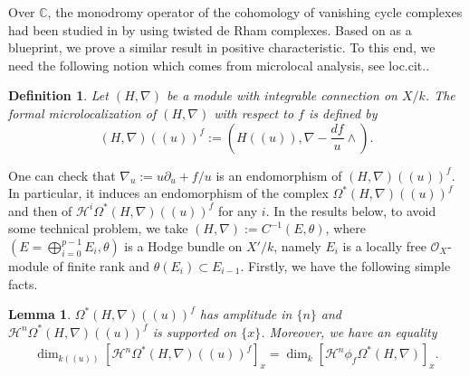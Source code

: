 \documentclass[12pt, a4paper]{article}
\newtheorem{definition}{Definition}[section]
\newtheorem{lemma}{Lemma}[section]
\begin{document}
Over $\mathbb C$, the monodromy operator of the cohomology of vanishing cycle complexes had been studied in \cite{SS} by using twisted de Rham complexes. Based on \cite[Theorem 2]{SS} as a blueprint, we prove a similar result in positive characteristic. 
To this end, we need the following notion which comes from microlocal analysis, see loc.cit..
\begin{definition}
Let $(H,\nabla)$ be a module with integrable connection on $X/k$. The formal microlocalization of $(H,\nabla)$ with respect to $f$ is defined by 
$$
(H,\nabla)((u))^f:=(H((u)),\nabla-\frac{df}{u}\wedge).
$$
\end{definition}
One can check that $\nabla_u:=u\partial_u+f/u$ is an endomorphism of $(H,\nabla)((u))^f$. In particular, it induces an endomorphism of the complex 
$\Omega^*(H,\nabla)((u))^f$ and then of $\mathcal H^i\Omega^*(H,\nabla)((u))^f$ for any $i$. In the results below, to avoid some technical problem, we take $(H,\nabla):=C^{-1}(E,\theta)$, where $(E=\bigoplus_{i=0}^{p-1}E_i,\theta)$ is a Hodge bundle on $X'/k$, namely $E_i$ is a locally free $\mathcal O_X$-module of finite rank and $\theta(E_i)\subset E_{i-1}$. 
Firstly, we have the following simple facts.
\begin{lemma}\label{equality dim}
$\Omega^*(H,\nabla)((u))^f$ has amplitude in $\{n\}$ and $\mathcal H^n\Omega^*(H,\nabla)((u))^f$ is supported on $\{x\}$. Moreover, we have an equality
\begin{eqnarray}\label{formal equality}
\dim_{k((u))}[\mathcal H^n\Omega^*(H,\nabla)((u))^f]_x=\dim_k[\mathcal H^n\phi_f\Omega^*(H,\nabla)]_x.
\end{eqnarray}
\end{lemma}
\end{document}
